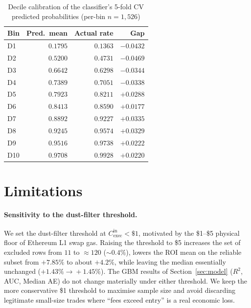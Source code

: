 \documentclass[sigconf,nonacm,10pt]{acmart}
\newcommand{\Cexec}{C_{\text{exec}}}
\begin{document}
\begin{table}[h]
  \centering
  \small
  \caption{Decile calibration of the classifier's 5-fold CV predicted
  probabilities (per-bin $n=1{,}526$)}
  \label{tab:calibration}
  \begin{tabular}{lrrr}
    \toprule
    \textbf{Bin} & \textbf{Pred.\ mean} & \textbf{Actual rate} & \textbf{Gap} \\
    \midrule
    D1  & $0.1795$ & $0.1363$ & $-0.0432$ \\
    D2  & $0.5200$ & $0.4731$ & $-0.0469$ \\
    D3  & $0.6642$ & $0.6298$ & $-0.0344$ \\
    D4  & $0.7389$ & $0.7051$ & $-0.0338$ \\
    D5  & $0.7923$ & $0.8211$ & $+0.0288$ \\
    D6  & $0.8413$ & $0.8590$ & $+0.0177$ \\
    D7  & $0.8892$ & $0.9227$ & $+0.0335$ \\
    D8  & $0.9245$ & $0.9574$ & $+0.0329$ \\
    D9  & $0.9516$ & $0.9738$ & $+0.0222$ \\
    D10 & $0.9708$ & $0.9928$ & $+0.0220$ \\
    \bottomrule
  \end{tabular}
\end{table}

\section{Limitations}
\label{sec:limitations}

\paragraph{Sensitivity to the dust-filter threshold.} We set the
dust-filter threshold at $\Cexec^{\text{in}}<\$1$, motivated by the
\$1--\$5 physical floor of Ethereum L1 swap gas. Raising the
threshold to \$5 increases the set of excluded rows from $11$ to
$\approx 120$ ($\sim 0.4\%$), lowers the ROI mean on the reliable
subset from $+7.85\%$ to about $+4.2\%$, while leaving the median
essentially unchanged ($+1.43\%\!\to\!+1.45\%$). The GBM results of
Section~\ref{sec:model} ($R^2$, AUC, Median AE) do not
change materially under either threshold. We keep the more
conservative \$1 threshold to maximise sample size and avoid
discarding legitimate small-size trades where ``fees exceed
entry'' is a real economic loss.
\end{document}
